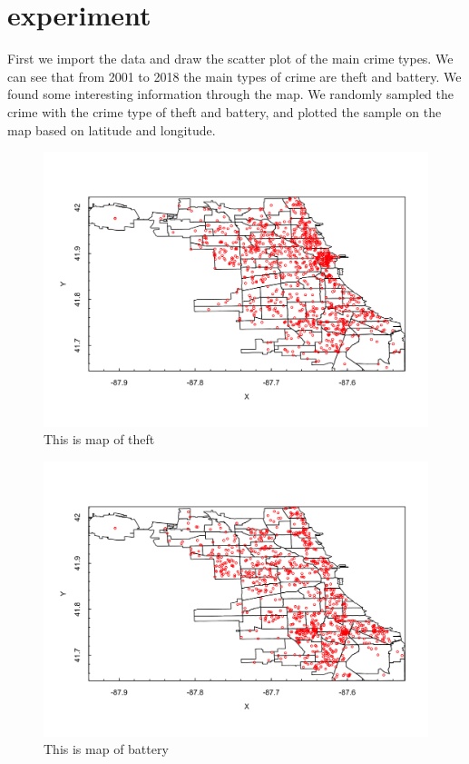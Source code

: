 \documentclass{article}
\begin{document}
\section{experiment}
First we import the data and draw the scatter plot of the main crime types. We can see that from 2001 to 2018 the main types of crime are theft and battery. We found some interesting information through the map. We randomly sampled the crime with the crime type of theft and battery, and plotted the sample on the map based on latitude and longitude.
\begin{figure}
    \caption{This is map of theft}
    \includegraphics[scale=0.25]{theft}    
\end{figure}

\begin{figure}
    \caption{This is map of battery}
    \includegraphics[scale=0.25]{battery}
\end{figure}
\end{document}
